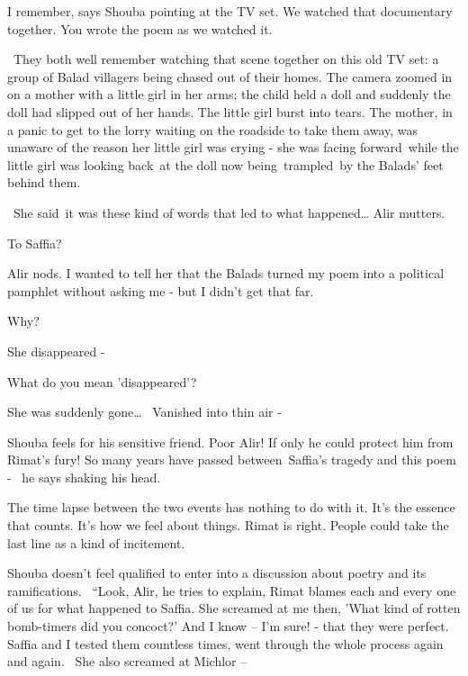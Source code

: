 \documentclass[letterpaper]{article}
\begin{document}
{\textquotedbl}I remember,{\textquotedbl} says Shouba pointing at the TV set. {\textquotedbl}We watched that documentary
together. You wrote the poem as we watched it.{\textquotedbl} 

\ They both well remember watching that scene together on this old TV set: a group of Balad villagers being chased out
of their homes. The camera zoomed in on a mother with a little girl in her arms; the child held a doll and suddenly the
doll had slipped out of her hands. The little girl burst into tears. The mother, in a panic to get to the lorry waiting
on the roadside to take them away, was unaware of the reason her little girl was crying - she was facing forward~while
the little girl was looking back~at the doll now being~trampled~by the Balads' feet behind them.

~{\textquotedbl}She said~it was these kind of words that led to what happened{\dots}{\textquotedbl} Alir mutters.

{\textquotedbl}To Saffia?{\textquotedbl} 

Alir nods. {\textquotedbl}I wanted to tell her that the Balads turned my poem into a political pamphlet without asking
me - but I didn't get that far.{\textquotedbl} 

{\textquotedbl}Why?{\textquotedbl} 

{\textquotedbl}She disappeared -{\textquotedbl} 

{\textquotedbl}What do you mean 'disappeared'?{\textquotedbl} 

{\textquotedbl}She was suddenly gone{\dots} \ Vanished into thin air -{\textquotedbl}

Shouba feels for his sensitive friend. Poor Alir! If only he could protect him from Rimat's fury! {\textquotedbl}So many
years have passed between~Saffia's tragedy and this poem -{\textquotedbl} \ he says shaking his head. 

{\textquotedbl}The time lapse between the two events has nothing to do with it. It's the essence that counts. It's how
we feel about things. Rimat is right. People could take the last line as a kind of incitement.{\textquotedbl} 

Shouba doesn't feel qualified to enter into a discussion about poetry and its{ }ramifications.
\ {}``Look, Alir,{\textquotedbl} he tries to explain, {\textquotedbl}Rimat blames each and every one of us for what
happened to Saffia. She screamed at me then, 'What kind of rotten bomb-timers did you concoct?' And I know -- I'm sure!
- that they were perfect. Saffia and I tested them countless times, went through the whole process again and again.
~She also screamed at Michlor --{\textquotedbl} 
\end{document}
